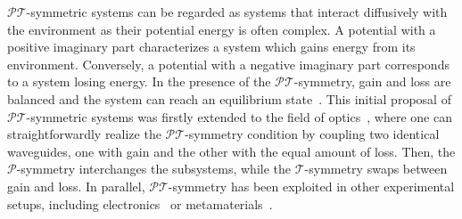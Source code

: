 $\mathcal{PT}$-symmetric systems can be regarded as systems that interact diffusively with the environment as their potential energy is often complex. A potential with a positive imaginary part characterizes a system which gains energy from its environment. Conversely, a potential with a negative imaginary part corresponds to a system losing energy. In the presence of the $\mathcal{PT}$-symmetry, gain and loss are balanced and the system can reach an equilibrium state~\cite{Bender_2015}. This initial proposal of $\mathcal{PT}$-symmetric systems was firstly extended to the field of optics~\cite{Zyablovsky_2014, El-Ganainy2018, ozdemir2019}, where one can straightforwardly realize the $\mathcal{PT}$-symmetry condition by coupling two identical waveguides, one with gain and the other with the equal amount of loss. Then, the $\mathcal{P}$-symmetry interchanges the subsystems, while the $\mathcal{T}$-symmetry swaps between gain and loss. In parallel, $\mathcal{PT}$-symmetry has been exploited in other experimental setups, including electronics~\cite{PhysRevA.84.040101} or metamaterials~\cite{PhysRevA.87.053824,PhysRevLett.113.023903}. 

